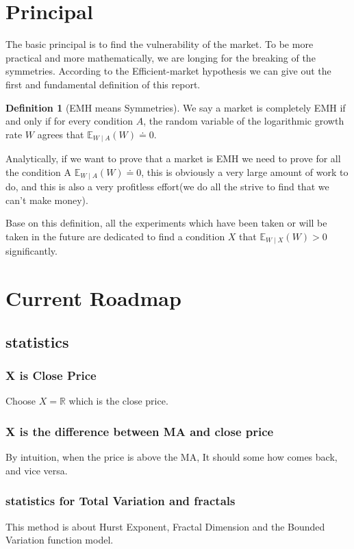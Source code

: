 \documentclass{article}
\theoremstyle{definition} %
\newtheorem{definition}{Definition}[section]
\begin{document}
\section{Principal}
The basic principal is to find the vulnerability
of the market. To be more practical and more
mathematically, we are longing for the breaking
of the symmetries. According to the
Efficient-market hypothesis\cite[Hypothesis]{EMH}
we can give out the first and fundamental
definition of this report.

\begin{definition}[EMH means Symmetries]
    \label{def:mydefinition}
    We say a market is completely EMH if and
    only if for every condition $A$, the random
    variable of the logarithmic growth rate $W$
    agrees that $\mathbb{E}_{W\mid A}(W)\doteq 0$.
\end{definition}

Analytically, if we want to prove that a market is
EMH we need to prove for all the condition A
$\mathbb{E}_{W\mid A}(W)\doteq 0$, this is
obviously a very large amount of work to do, and
this is also a very profitless effort(we do all
the strive to find that we can't make money).

Base on this definition, all the experiments which
have been taken or will be taken in the future
are dedicated to find a condition $X$ that
$\mathbb{E}_{W\mid X}(W)>0$ significantly.

\section{Current Roadmap}
\subsection{statistics}
\subsubsection{X is Close Price}
Choose $X=\mathbb{R}$ which is the close price.
\subsubsection{X is the difference between MA and close price}
By intuition, when the price is above the MA,
It should some how comes back, and vice versa.
\subsubsection{statistics for Total Variation and fractals}
This method is about Hurst Exponent,
Fractal Dimension and the Bounded Variation
function model.
\end{document}
